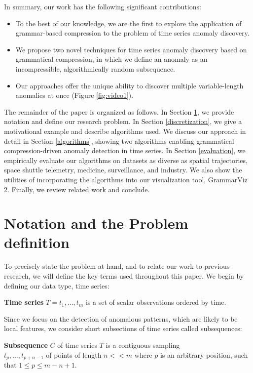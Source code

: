 \documentclass{sig-alternate}
\begin{document}
In summary, our work has the following significant contributions:
\begin{itemize}
\item To the best of our knowledge, we are the first to explore the application of grammar-based compression to the problem of time series anomaly discovery.
\item We propose two novel techniques for time series anomaly discovery based on grammatical compression, in which we define an anomaly as an incompressible, algorithmically random subsequence.
\item Our approaches offer the unique ability to discover multiple variable-length anomalies at once (Figure \ref{fig:video1}).
\end{itemize}
The remainder of the paper is organized as follows. In Section \ref{problem}, we provide notation and define our research problem. In Section \ref{discretization}, we give a motivational example and describe algorithms used. We discuss our approach in detail in Section \ref{algorithms}, showing two algorithms enabling grammatical compression-driven anomaly detection in time series. In Section \ref{evaluation}, we empirically evaluate our algorithms on datasets as diverse as spatial trajectories, space shuttle telemetry, medicine, surveillance, and industry. We also show the utilities of incorporating the algorithms into our visualization tool, GrammarViz 2. Finally, we review related work and conclude.

\section{Notation and the Problem\\ definition}\label{problem}
To precisely state the problem at hand, and to relate our work to previous research, we will define the key terms used throughout this paper. We begin by defining our data type, time series:

\textbf{Time series} $T = t_{1},\dots,t_{m}$ is a set of scalar observations ordered by time.

Since we focus on the detection of anomalous patterns, which are likely to be local features, we consider short subsections of time series called subsequences:

\textbf{Subsequence} $C$ of time series $T$ is a contiguous sampling \\$t_{p},\dots,t_{p+n-1}$ of points of length $n << m$ where $p$ is an arbitrary position, such that $ 1 \leq p \leq m - n + 1$.
\end{document}
